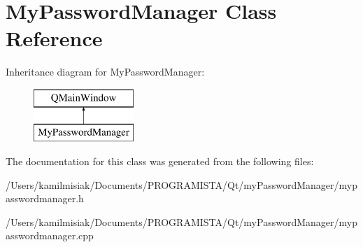 \hypertarget{class_my_password_manager}{}\section{My\+Password\+Manager Class Reference}
\label{class_my_password_manager}
Inheritance diagram for My\+Password\+Manager\+:\begin{figure}[H]
\begin{center}
\leavevmode
\includegraphics[height=2.000000cm]{class_my_password_manager}
\end{center}
\end{figure}


The documentation for this class was generated from the following files\+:\begin{DoxyCompactItemize}
\item 
/\+Users/kamilmisiak/\+Documents/\+P\+R\+O\+G\+R\+A\+M\+I\+S\+T\+A/\+Qt/my\+Password\+Manager/mypasswordmanager.\+h\item 
/\+Users/kamilmisiak/\+Documents/\+P\+R\+O\+G\+R\+A\+M\+I\+S\+T\+A/\+Qt/my\+Password\+Manager/mypasswordmanager.\+cpp\end{DoxyCompactItemize}
